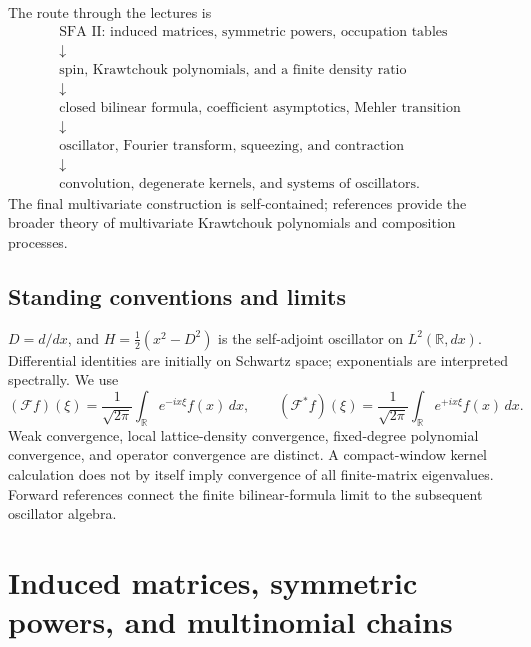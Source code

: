 \documentclass[11pt,reqno]{amsart}
\theoremstyle{definition}
\theoremstyle{remark}
\newcommand{\R}{\mathbb R}
\newcommand{\F}{\mathcal F}
\begin{document}
The route through the lectures is
\[
\begin{array}{c}
\text{SFA II: induced matrices, symmetric powers, occupation tables}\\
\downarrow\\
\text{spin, Krawtchouk polynomials, and a finite density ratio}\\
\downarrow\\
\text{closed bilinear formula, coefficient asymptotics, Mehler transition}\\
\downarrow\\
\text{oscillator, Fourier transform, squeezing, and contraction}\\
\downarrow\\
\text{convolution, degenerate kernels, and systems of oscillators}.
\end{array}
\]
The final multivariate construction is self-contained; references
\cite{Griffiths1971,Griffiths2016} provide the broader theory of
multivariate Krawtchouk polynomials and composition processes.

\subsection*{Standing conventions and limits}
$D=d/dx$, and $H=\frac12(x^2-D^2)$ is the self-adjoint oscillator on
$L^2(\R,dx)$. Differential identities are initially on Schwartz space;
exponentials are interpreted spectrally. We use
\begin{equation}\label{eq:F}
(\F f)(\xi)=\frac1{\sqrt{2\pi}}\int_\R e^{-ix\xi}f(x)\,dx,\qquad
(\F^*f)(\xi)=\frac1{\sqrt{2\pi}}\int_\R e^{+ix\xi}f(x)\,dx.
\end{equation}
Weak convergence, local lattice-density convergence, fixed-degree
polynomial convergence, and operator convergence are distinct. A
compact-window kernel calculation does not by itself imply convergence
of all finite-matrix eigenvalues. Forward references connect the finite bilinear-formula limit to the
subsequent oscillator algebra.

\section{Induced matrices, symmetric powers, and multinomial chains}\label{L:tensors}
\end{document}
